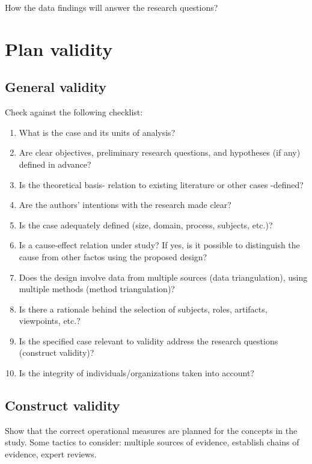 How the data findings will answer the research questions?

\section{Plan validity}
\label{sec:planvalidity}

\subsection{General validity}
\label{subsec:general}
Check against the following checklist:

\begin{tcolorbox}[colback=black!5!white,colframe=black!75!white,title=Checklist for Case Design from \cite{runeson2009guidelines}]
    \begin{enumerate}
      \item What is the case and its units of analysis?
      \item Are clear objectives, preliminary research questions, and hypotheses (if any) defined in advance?
      \item Is the theoretical basis- relation to existing literature or other cases -defined?
      \item Are the authors' intentions with the research made clear?
      \item Is the case adequately defined (size, domain, process, subjects, etc.)?
      \item Is a cause-effect relation under study? If yes, is it possible to distinguish the cause from other factos using the proposed design?
      \item Does the design involve data from multiple sources (data triangulation), using multiple methods (method triangulation)?
      \item Is there a rationale behind the selection of subjects, roles, artifacts, viewpoints, etc.?
      \item Is the specified case relevant to validity address the research questions (construct validity)?
      \item Is the integrity of individuals/organizations taken into account?
    \end{enumerate}
  \end{tcolorbox}

\subsection{Construct validity}
\label{subsec:construct}
Show that the correct operational measures are planned for the concepts in the study. Some tactics to consider: multiple sources of evidence, establish chains of evidence, expert reviews. 

